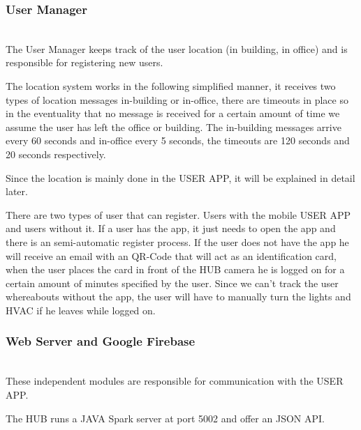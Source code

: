 \subsubsection{User Manager}\mbox{}\\


The User Manager keeps track of the user location (in building, in office) and is responsible for registering new users.

The location system works in the following simplified manner, it receives two types of location messages in-building or in-office, there are timeouts in place so in the eventuality that no message is received for a certain amount of time we assume the user has left the office or building. The in-building messages arrive every 60 seconds and in-office every 5 seconds, the timeouts are 120 seconds and 20 seconds respectively.

Since the location is mainly done in the USER APP, it will be explained in detail later.


There are two types of user that can register. Users with the mobile USER APP and users without it. If a user has the app, it just needs to open the app and there is an semi-automatic register process. If the user does not have the app he will receive an email with an QR-Code that will act as an identification card, when the user places the card in front of the HUB camera he is logged on for a certain amount of minutes specified by the user. Since we can't track the user whereabouts without the app, the user will have to manually turn the lights and \ac{HVAC} if he leaves while logged on.



\subsubsection{Web Server and Google Firebase}\mbox{}\\

These independent modules are responsible for communication with the USER APP.

The HUB runs a JAVA Spark server at port 5002 and offer an \ac{JSON} API.

